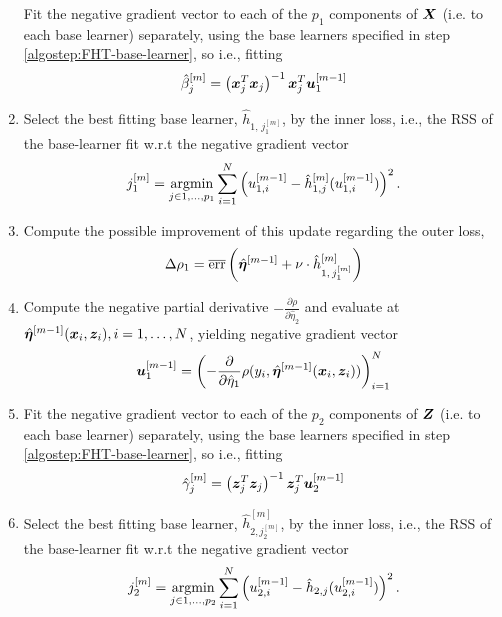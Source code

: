 \begin{enumerate}
        Fit the negative gradient vector to each of the $p_1$ components of $\bm{X}$ (i.e. to each base learner) separately, using the base learners specified in step \ref{algostep:FHT-base-learner}, so i.e., fitting
        \begin{equation*}
            \hat{\beta}^{[m]}_{j}=\left(\bm{x}_j^T\bm{x}_j\right)^{-1}\bm{x}_j^T\bm{u}^{[m-1]}_1
        \end{equation*}
    \item
        Select the best fitting base learner, $\hat{h}_{1,\,j_1^{[m]}}$, by the inner loss,
        i.e., the RSS of the base-learner fit w.r.t the negative gradient vector
        \begin{equation}
            j_1^{[m]}=\operatorname*{argmin}_{j\in 1,\ldots,p_1}\sum_{i=1}^N\left(u_{1,i}^{[m-1]}-\hat{h}^{[m]}_{1,j}(u_{1,i}^{[m-1]})\right)^2.
        \end{equation}
    \item
        Compute the possible improvement of this update regarding the outer loss,
        \begin{equation}
            \Delta\rho_1=\overline{\text{err}}\left(\hat{\boldsymbol{\eta}}^{[m-1]} + \nu \cdot \hat{h}^{[m]}_{1,\,j_1^{[m]}} \right)
        \end{equation}
    \item
        Compute the negative partial derivative $-\frac{\partial\rho}{\partial \hat{\eta}_2}$
        and evaluate at $\hat{\boldsymbol{\eta}}^{[m-1]}(\bm{x}_i,\bm{z}_i),i=1,\ldots,N$, yielding negative gradient vector
        \begin{equation}
            \bm{u}^{[m-1]}_1=\left(-\frac{\partial}{\partial \hat{\eta}_1}\rho(y_i, \hat{\boldsymbol{\eta}}^{[m-1]}(\bm{x}_i,\bm{z}_i))\right)_{i=1}^N
        \end{equation}
    \item
        Fit the negative gradient vector to each of the $p_2$ components of $\bm{Z}$ (i.e. to each base learner) separately, using the base learners specified in step \ref{algostep:FHT-base-learner}, so i.e., fitting
        \begin{equation*}
            \hat{\gamma}^{[m]}_{j}=\left(\bm{z}_j^T\bm{z}_j\right)^{-1}\bm{z}_j^T\bm{u}^{[m-1]}_2
        \end{equation*}
    \item
        Select the best fitting base learner, $\hat{h}^{[m]}_{2,j_2^{[m]}}$, by the inner loss,
        i.e., the RSS of the base-learner fit w.r.t the negative gradient vector
        \begin{equation*}
            j_2^{[m]}=\argmin_{j\in 1,\ldots,p_2}\sum_{i=1}^N\left(u_{2,i}^{[m-1]}-\hat{h}_{2,j}(u_{2,i}^{[m-1]})\right)^2.

\end{equation*}
\end{enumerate}
